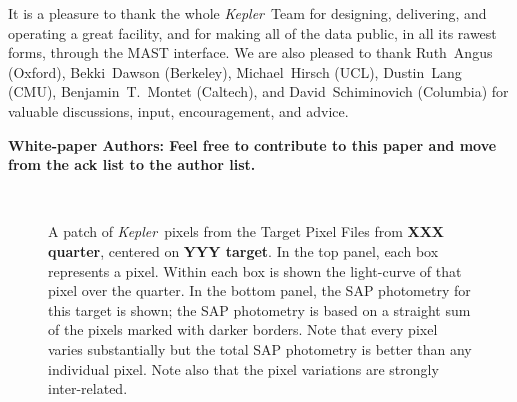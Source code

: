 \documentclass[12pt, preprint]{aastex}
\newcommand{\project}[1]{\textsl{#1}}
\newcommand{\Kepler}{\project{Kepler}}
\newcommand{\todo}[1]{\textbf{#1}}
\begin{document}
\acknowledgements
It is a pleasure to thank the whole \Kepler\ Team
  for designing, delivering, and operating a great facility,
  and for making all of the data public, in all its rawest forms, through the MAST interface.
We are also pleased to thank
  Ruth~Angus (Oxford),
  Bekki~Dawson (Berkeley),
  Michael~Hirsch (UCL),
  Dustin~Lang (CMU),
  Benjamin~T.~Montet (Caltech),
  and
  David~Schiminovich (Columbia)
for valuable discussions, input, encouragement, and advice.

\todo{White-paper Authors:  Feel free to contribute to this paper and move from the ack list to the author list.}

\clearpage
\begin{figure}
~ %
\caption{A patch of \Kepler\ pixels from the Target Pixel Files
  from \todo{XXX quarter}, centered on \todo{YYY target}.
  In the top panel, each box represents a pixel.
  Within each box is shown the light-curve of that pixel over the quarter.
  In the bottom panel, the SAP photometry for this target is shown;
  the SAP photometry is based on a straight sum of the pixels marked with darker borders.
  Note that every pixel varies substantially but the total SAP photometry is better than any individual pixel.
  Note also that the pixel variations are strongly inter-related.\label{fig:pixelpatch}}
\end{figure}
\end{document}
